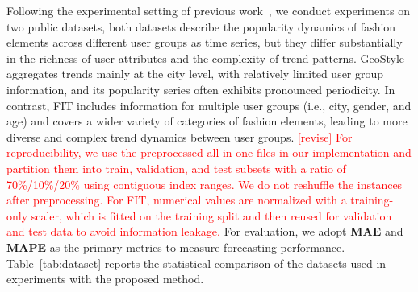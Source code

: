 \documentclass[Afour,sageh,times]{sagej}
\newcommand{\zhang}[1]{\textcolor{red}{[revise] #1}}
\begin{document}
{Following the experimental setting of previous work~\cite{ma2020knowledge}, we conduct experiments on two public datasets, both datasets describe the popularity dynamics of fashion elements across different user groups as time series, but they differ substantially in the richness of user attributes and the complexity of trend patterns. 
GeoStyle aggregates trends mainly at the city level, with relatively limited user group information, and its popularity series often exhibits pronounced periodicity.
In contrast, FIT includes information for multiple user groups (i.e., city, gender, and age) and covers a wider variety of categories of fashion elements, leading to more diverse and complex trend dynamics between user groups. \zhang{For reproducibility, we use the preprocessed all-in-one files in our implementation and partition them into train, validation, and test subsets with a ratio of 70\%/10\%/20\% using contiguous index ranges. We do not reshuffle the instances after preprocessing. For FIT, numerical values are normalized with a training-only scaler, which is fitted on the training split and then reused for validation and test data to avoid information leakage.}
For evaluation, we adopt \textbf{MAE} and \textbf{MAPE} as the primary metrics to measure forecasting performance. Table~\ref{tab:dataset} reports the statistical comparison of the datasets used in experiments with the proposed method.

\begin{table}[t]
\centering
\caption{Statistical Comparison Between FIT and GeoStyle Datasets. \textbf{\#FE} denotes the number of fashion elements, and \textbf{\#Seq} denotes the number of sequences.}

\label{tab:dataset}
\end{table}

\begin{table}[t]
\centering
\caption{Overall forecasting performance of different methods on the GeoStyle and FIT datasets. ``*'' indicates values extracted from the performance plots reported in the original TS-BiLSTM paper, since exact numerical results were not provided in tabular form.}


\end{table}}
\end{document}
